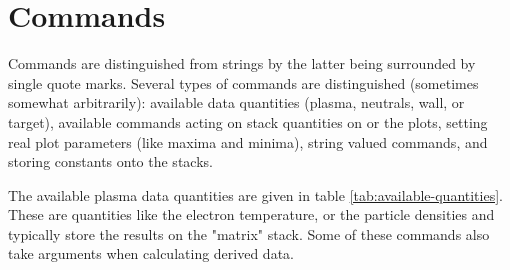 \documentclass[a4paper,10pt]{report}
\begin{document}
\section{Commands}

Commands are
distinguished from strings by the latter being surrounded by single
quote marks.  Several types of commands are distinguished (sometimes
somewhat arbitrarily): available data quantities (plasma, neutrals, wall,
or target), available commands acting on stack quantities on or the plots,
setting real plot parameters (like maxima and minima), string valued commands,
and storing constants onto the stacks.

The available plasma data quantities are given in table
\ref{tab:available-quantities}. These are quantities like the electron
temperature, or the particle densities and typically store the results
on the "matrix" stack.  Some of these commands also take arguments
when calculating derived data.
\end{document}
